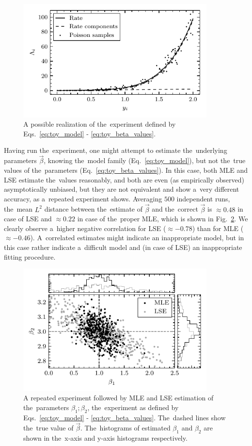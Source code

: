 \begin{figure}[ht]
 	\centering
 	\includegraphics[width=10cm]{figures/toy_model_curve.pdf}
 	\caption{A possible realization of the~experiment defined by Eqs.~\ref{eq:toy_model} - \ref{eq:toy_beta_values}.}
 	\label{fig:toy_model_curve}
\end{figure}

Having run the~experiment, one might attempt to estimate the~underlying parameters $\vec{\beta}$, knowing the~model family (Eq.~\ref{eq:toy_model}), but not the~true values of the~parameters (Eq.~\ref{eq:toy_beta_values}). In this case, both MLE and LSE estimate the~values reasonably, and both are even (as empirically observed) asymptotically unbiased, but they are not equivalent and show a~very different accuracy, as a~repeated experiment shows. Averaging $500$ independent runs, the~mean $L^2$ distance between the~estimate of $\vec{\beta}$ and the~correct $\vec{\beta}$ is $\approx 0.48$ in case of LSE and $\approx 0.22$ in case of the~proper MLE, which is shown in Fig.~\ref{fig:toy_model_draws}. We clearly observe a~higher negative correlation for LSE ($\approx -0.78 $) than for MLE ($\approx -0.46 $). A~correlated estimates might indicate an inappropriate model, but in this case rather indicate a~difficult model and (in case of LSE) an inappropriate fitting procedure.

\begin{figure}[ht]
 	\centering
 	\includegraphics[width=10cm]{figures/toy_model_draws.pdf}
 	\caption{A repeated experiment followed by MLE and LSE estimation of the~parameters $\beta_1; \beta_2$, the~experiment as defined by Eqs.~\ref{eq:toy_model} - \ref{eq:toy_beta_values}. The~dashed lines show the~true value of $\vec{\beta}$. The~histograms of estimated $\beta_1$ and $\beta_2$ are shown in the~x-axis and y-axis histograms respectively.}
 	\label{fig:toy_model_draws}
\end{figure}


